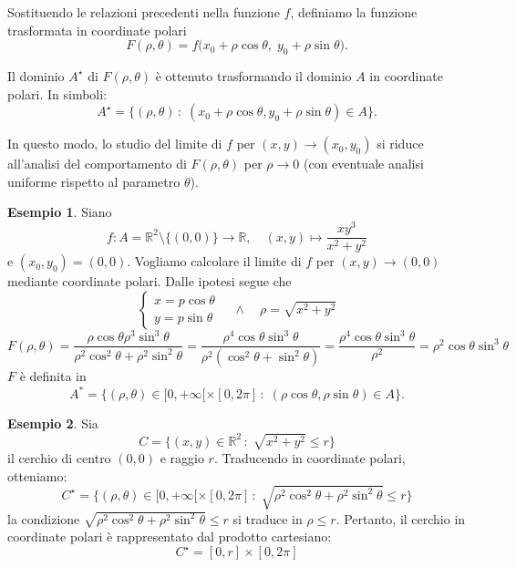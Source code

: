 \documentclass{article}
\theoremstyle{plain}
\theoremstyle{definition}
\newtheorem{exmp}{Esempio}[section]
\theoremstyle{remark}
\begin{document}
Sostituendo le relazioni precedenti nella funzione \(f\), definiamo la funzione trasformata in coordinate polari
\[
F(\rho,\theta) = f\bigl(x_0+\rho\cos\theta,\;y_0+\rho\sin\theta\bigr).
\]

Il dominio \(A^\star\) di $F(\rho,\theta)$ è ottenuto trasformando il dominio \(A\) in coordinate polari. 
In simboli:
\[A^\star=\{(\rho,\theta)\,:\;(x_0+\rho\cos\theta,y_0+\rho\sin\theta)\in A\}.\]

In questo modo, lo studio del limite di \(f\) per \((x,y)\to(x_0,y_0)\) si riduce all'analisi del comportamento di \(F(\rho,\theta)\) per \(\rho \to 0\) (con eventuale analisi uniforme rispetto al parametro \(\theta\)).

\vspace{10pt}

\begin{exmp}
    Siano 
    \[f:A=\mathbb{R}^2\setminus\{(0,0)\}\to\mathbb{R},\quad (x,y)\mapsto \dfrac{xy^3}{x^2+y^2}\] 
    e \((x_0,y_0)=(0,0)\).
    Vogliamo calcolare il limite di \(f\) per \((x,y)\to(0,0)\) mediante coordinate polari.
    Dalle ipotesi segue che
    \[\begin{cases}
        x=p\cos\theta\\
        y=p\sin\theta
    \end{cases}\quad \land\quad\rho=\sqrt{x^2+y^2}\]    
    \[F(\rho,\theta)=\dfrac{\rho\cos\theta\rho^3\sin^3\theta}{\rho^2\cos^2\theta+\rho^2\sin^2\theta}=\dfrac{\rho^4\cos\theta\sin^3\theta}{\rho^2(\cos^2\theta+\sin^2\theta)}=\dfrac{\rho^4\cos\theta\sin^3\theta}{\rho^2}=\rho^2\cos\theta\sin^3\theta\]
    $F$ è definita in 
    \[A^*=\{(\rho,\theta)\in[0,+\infty[\times[0,2\pi]\,:\;(\rho\cos\theta,\rho\sin\theta)\in A\}.\]
\end{exmp}

\vspace{10pt}

\begin{exmp}
    Sia \[C=\{(x,y)\in\mathbb{R}^2\,:\;\sqrt{x^2+y^2}\leq r\}\]
    il cerchio di centro \((0,0)\) e raggio \(r\).
    Traducendo in coordinate polari, otteniamo:
    \[C^\star=\{(\rho,\theta)\in[0,+\infty[\times[0,2\pi]\,:\;\sqrt{\rho^2\cos^2\theta+\rho^2\sin^2\theta}\leq r\}\]
    la condizione $\sqrt{\rho^2\cos^2\theta+\rho^2\sin^2\theta}\leq r$ si traduce in $\rho\leq r$.
    Pertanto, il cerchio in coordinate polari è rappresentato dal prodotto cartesiano:
    \[C^\star=[0,r]\times[0,2\pi]\]
\end{exmp}

\vspace{10pt}
\end{document}
